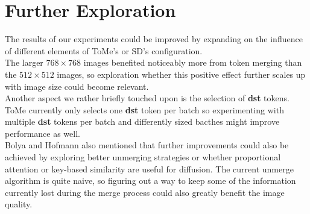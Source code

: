 \section{Further Exploration}
The results of our experiments could be improved by expanding on the influence of different elements of ToMe's or SD's configuration.\\ 
The larger $768 \times 768$ images benefited noticeably more from token merging than the $512 \times 512$ images, so exploration whether this positive effect further scales up with image size could become relevant.\\
Another aspect we rather briefly touched upon is the selection of \textbf{dst} tokens. ToMe currently only selects one \textbf{dst} token per batch so experimenting with multiple \textbf{dst} tokens per batch and differently sized bacthes might improve performance as well.\\ 
Bolya and Hofmann also mentioned that further improvements could also be achieved by exploring better unmerging strategies or whether proportional attention or key-based similarity are useful for diffusion.
The current unmerge algorithm is quite naive, so figuring out a way to keep some of the information currently lost during the merge process could also greatly benefit the image quality.\\
